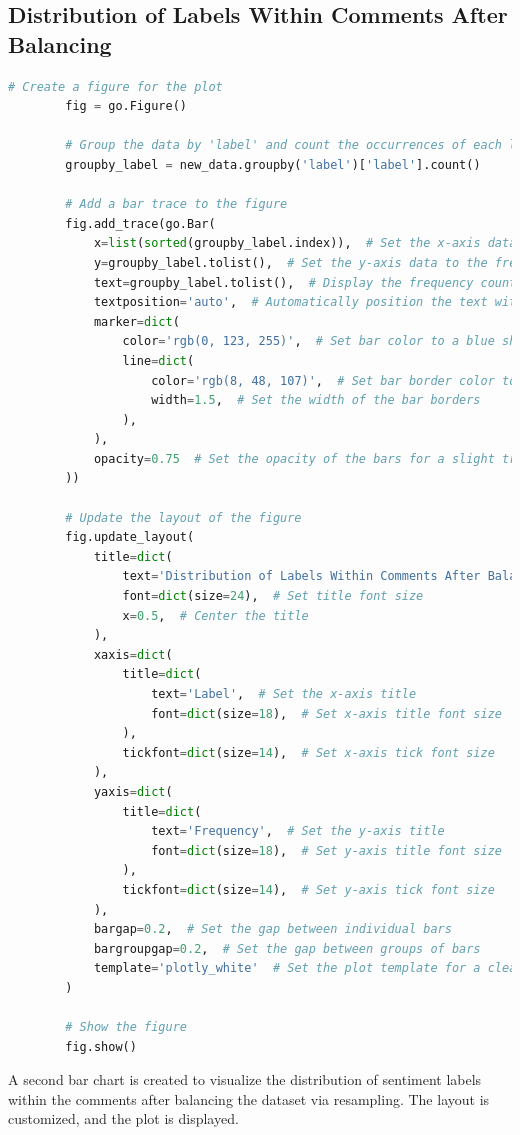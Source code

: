 \documentclass{solutionclass} %
\begin{document}
\begin{solution}
        \subsection*{Distribution of Labels Within Comments After Balancing}
        
        \begin{lstlisting}[language=Python, basicstyle=\ttfamily\footnotesize, keywordstyle=\color{blue}, commentstyle=\color{gray}]
        # Create a figure for the plot
        fig = go.Figure()
        
        # Group the data by 'label' and count the occurrences of each label
        groupby_label = new_data.groupby('label')['label'].count()
        
        # Add a bar trace to the figure
        fig.add_trace(go.Bar(
            x=list(sorted(groupby_label.index)),  # Set the x-axis data to the sorted unique labels
            y=groupby_label.tolist(),  # Set the y-axis data to the frequency counts of each label
            text=groupby_label.tolist(),  # Display the frequency counts as text on the bars
            textposition='auto',  # Automatically position the text within the bars
            marker=dict(
                color='rgb(0, 123, 255)',  # Set bar color to a blue shade
                line=dict(
                    color='rgb(8, 48, 107)',  # Set bar border color to a darker blue
                    width=1.5,  # Set the width of the bar borders
                ),
            ),
            opacity=0.75  # Set the opacity of the bars for a slight transparency effect
        ))
        
        # Update the layout of the figure
        fig.update_layout(
            title=dict(
                text='Distribution of Labels Within Comments After Balancing Labels via Resampling',  # Set the title of the plot
                font=dict(size=24),  # Set title font size
                x=0.5,  # Center the title
            ),
            xaxis=dict(
                title=dict(
                    text='Label',  # Set the x-axis title
                    font=dict(size=18),  # Set x-axis title font size
                ),
                tickfont=dict(size=14),  # Set x-axis tick font size
            ),
            yaxis=dict(
                title=dict(
                    text='Frequency',  # Set the y-axis title
                    font=dict(size=18),  # Set y-axis title font size
                ),
                tickfont=dict(size=14),  # Set y-axis tick font size
            ),
            bargap=0.2,  # Set the gap between individual bars
            bargroupgap=0.2,  # Set the gap between groups of bars
            template='plotly_white'  # Set the plot template for a cleaner look
        )
        
        # Show the figure
        fig.show()
        \end{lstlisting}
        
        A second bar chart is created to visualize the distribution of sentiment labels within the comments after balancing the dataset via resampling. The layout is customized, and the plot is displayed.

\end{solution}
\end{document}
